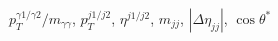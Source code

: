$p_T^{\gamma 1/\gamma 2}/m_{\gamma\gamma}$, $p_T^{j1/j2}$, $\eta^{j1/j2}$, $m_{jj}$, $|\Delta\eta_{jj}|$, $\cos{\theta^*}$